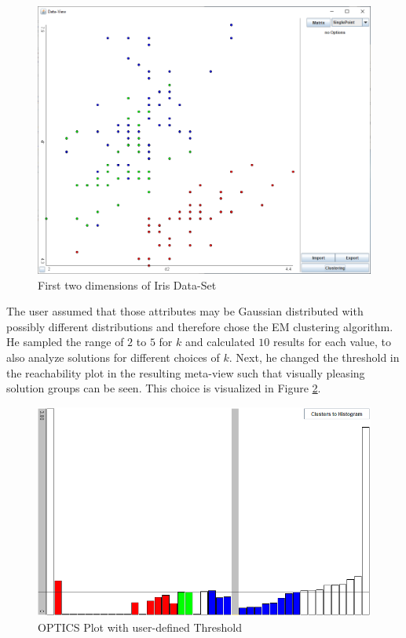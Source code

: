 \documentclass[
	a4paper,
	english,
	twoside,
	openright,               
	11pt                            
	]{report}
\begin{document}
\begin{figure}[h]
	\centering
	\includegraphics[scale=.4]{iris2}
	\caption{First two dimensions of Iris Data-Set}
	\label{fig:iris}
\end{figure}

The user assumed that those attributes may be Gaussian distributed with possibly different distributions and therefore chose the EM clustering algorithm. He sampled the range of $2$ to $5$ for $k$ and calculated $10$ results for each value, to also analyze solutions for different choices of $k$. Next, he changed the threshold in the reachability plot in the resulting meta-view such that visually pleasing solution groups can be seen. This choice is visualized in Figure \ref{fig:user_iris_optics}.

\begin{figure}[h]
	\centering
	\includegraphics[scale=.4]{user_iris_optics}
	\caption{OPTICS Plot with user-defined Threshold}
	\label{fig:user_iris_optics}
\end{figure}
\end{document}
